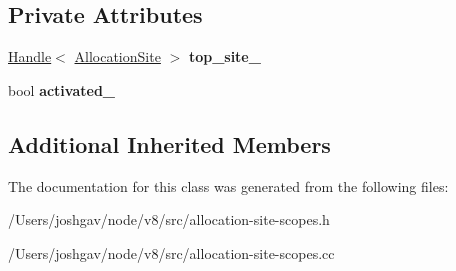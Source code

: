 \subsection*{Private Attributes}
\begin{DoxyCompactItemize}
\item 
\hyperlink{classv8_1_1internal_1_1_handle}{Handle}$<$ \hyperlink{classv8_1_1internal_1_1_allocation_site}{Allocation\+Site} $>$ {\bfseries top\+\_\+site\+\_\+}\hypertarget{classv8_1_1internal_1_1_allocation_site_usage_context_a2ac61f80b107f7fb8bb16366d27c4a99}{}\label{classv8_1_1internal_1_1_allocation_site_usage_context_a2ac61f80b107f7fb8bb16366d27c4a99}

\item 
bool {\bfseries activated\+\_\+}\hypertarget{classv8_1_1internal_1_1_allocation_site_usage_context_af145939858ec956498e774717642cc26}{}\label{classv8_1_1internal_1_1_allocation_site_usage_context_af145939858ec956498e774717642cc26}

\end{DoxyCompactItemize}
\subsection*{Additional Inherited Members}


The documentation for this class was generated from the following files\+:\begin{DoxyCompactItemize}
\item 
/\+Users/joshgav/node/v8/src/allocation-\/site-\/scopes.\+h\item 
/\+Users/joshgav/node/v8/src/allocation-\/site-\/scopes.\+cc\end{DoxyCompactItemize}
